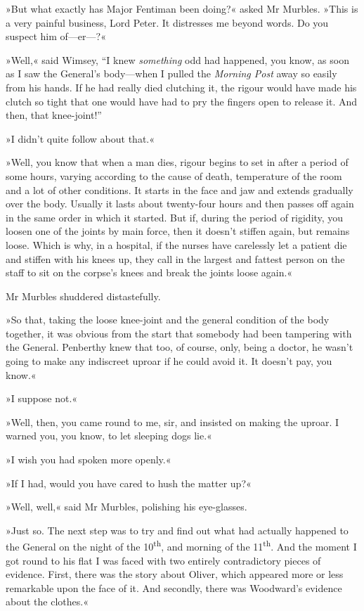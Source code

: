 »But what exactly has Major Fentiman been doing?« asked Mr Murbles. »This is a very painful business, Lord Peter. It distresses me beyond words. Do you suspect him of\allowbreak---\allowbreak er---?«

»Well,« said Wimsey, \enquote{I knew \textit{something} odd had happened, you know, as soon as I saw the General's body\allowbreak---\allowbreak when I pulled the \textit{Morning Post} away so easily from his hands. If he had really died clutching it, the rigour would have made his clutch so tight that one would have had to pry the fingers open to release it. And then, that knee-joint!}

»I didn't quite follow about that.«

»Well, you know that when a man dies, rigour begins to set in after a period of some hours, varying according to the cause of death, temperature of the room and a lot of other conditions. It starts in the face and jaw and extends gradually over the body. Usually it lasts about twenty-four hours and then passes off again in the same order in which it started. But if, during the period of rigidity, you loosen one of the joints by main force, then it doesn't stiffen again, but remains loose. Which is why, in a hospital, if the nurses have carelessly let a patient die and stiffen with his knees up, they call in the largest and fattest person on the staff to sit on the corpse's knees and break the joints loose again.«

Mr Murbles shuddered distastefully.

»So that, taking the loose knee-joint and the general condition of the body together, it was obvious from the start that somebody had been tampering with the General. Penberthy knew that too, of course, only, being a doctor, he wasn't going to make any indiscreet uproar if he could avoid it. It doesn't pay, you know.«

»I suppose not.«

»Well, then, you came round to me, sir, and insisted on making the uproar. I warned you, you know, to let sleeping dogs lie.«

»I wish you had spoken more openly.«

»If I had, would you have cared to hush the matter up?«

»Well, well,« said Mr Murbles, polishing his eye-glasses.

»Just so. The next step was to try and find out what had actually happened to the General on the night of the  10\textsuperscript{th}, and morning of the  11\textsuperscript{th}. And the moment I got round to his flat I was faced with two entirely contradictory pieces of evidence. First, there was the story about Oliver, which appeared more or less remarkable upon the face of it. And secondly, there was Woodward's evidence about the clothes.«

